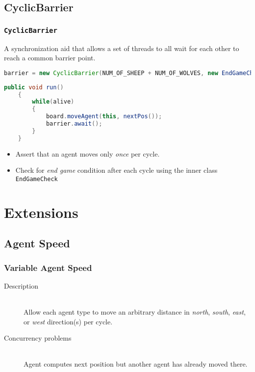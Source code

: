 \documentclass{beamer}
\begin{document}
\subsection{CyclicBarrier}
\begin{frame}[fragile]
	\frametitle{{\tt CyclicBarrier}}
	\begin{definition}
	A synchronization aid that allows a set of threads to all wait for each other to reach a common barrier point.
	\end{definition}

	\begin{lstlisting}[language=Java,caption={Initializing the {\tt CyclicBarrier} in {\tt Game.java}}]
	barrier = new CyclicBarrier(NUM_OF_SHEEP + NUM_OF_WOLVES, new EndGameCheck());
	\end{lstlisting}
	
	\begin{lstlisting}[language=Java,caption={Using the {\tt CyclicBarrier} in {\tt Agent.java}}]
	public void run()
	{
	    while(alive)
	    {
	        board.moveAgent(this, nextPos());
	        barrier.await();
	    }
	}
	\end{lstlisting}
	
	\begin{itemize}
		\item Assert that an agent moves only {\em once} per cycle.
		\item Check for {\em end game} condition after each cycle using the inner class {\tt EndGameCheck}
	\end{itemize}
\end{frame}

\section{Extensions}

\subsection{Agent Speed}
\begin{frame}
	\frametitle{Variable Agent Speed}	
	\begin{description}
		\item[Description] \hfill \\
		Allow each agent type to move an arbitrary distance in {\em north}, {\em south}, {\em east}, or {\em west} direction(s) per cycle.
		\item[Concurrency problems] \hfill \\
		Agent computes next position but another agent has already moved there.
	\end{description}
\end{frame}
\end{document}

